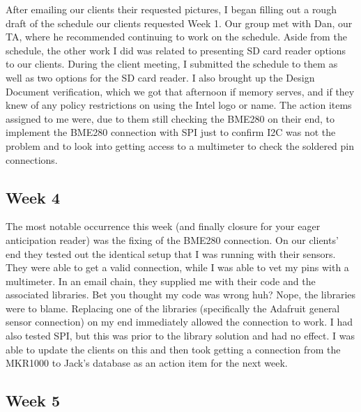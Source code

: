 \documentclass[IEEEtran,letterpaper,10pt,titlepage,fleqn,draftclsnofoot,onecolumn]{article}
\begin{document}
After emailing our clients their requested pictures, I began filling out a rough draft of the schedule our clients requested Week 1. Our group met with Dan, our TA, where he recommended continuing to work on the schedule. Aside from the schedule, the other work I did was related to presenting SD card reader options to our clients. During the client meeting, I submitted the schedule to them as well as two options for the SD card reader. I also brought up the Design Document verification, which we got that afternoon if memory serves, and if they knew of any policy restrictions on using the Intel logo or name. The action items assigned to me were, due to them still checking the BME280 on their end, to implement the BME280 connection with SPI just to confirm I2C was not the problem and to look into getting access to a multimeter to check the soldered pin connections.

\subsection{Week 4}

The most notable occurrence this week (and finally closure for your eager anticipation reader) was the fixing of the BME280 connection. On our clients’ end they tested out the identical setup that I was running with their sensors. They were able to get a valid connection, while I was able to vet my pins with a multimeter. In an email chain, they supplied me with their code and the associated libraries. Bet you thought my code was wrong huh? Nope, the libraries were to blame. Replacing one of the libraries (specifically the Adafruit general sensor connection) on my end immediately allowed the connection to work. I had also tested SPI, but this was prior to the library solution and had no effect. I was able to update the clients on this and then took getting a connection from the MKR1000 to Jack’s database as an action item for the next week.

\subsection{Week 5}
\end{document}
